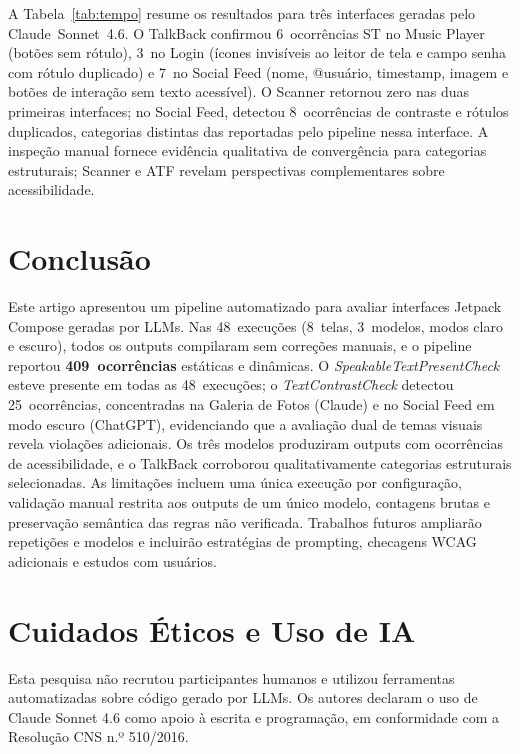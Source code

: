 \documentclass[sigconf,anonymous,review]{webmedia}
\begin{document}
A Tabela~\ref{tab:tempo} resume os resultados para três interfaces
geradas pelo Claude~Sonnet~4.6. O TalkBack confirmou 6~ocorrências
ST no Music Player (botões sem rótulo), 3~no Login (ícones invisíveis
ao leitor de tela e campo senha com rótulo duplicado) e 7~no Social
Feed (nome, @usuário, timestamp, imagem e botões de interação sem
texto acessível). O Scanner retornou zero nas duas primeiras
interfaces; no Social Feed, detectou 8~ocorrências de contraste e
rótulos duplicados, categorias distintas das reportadas pelo
pipeline nessa interface. A inspeção manual fornece evidência
qualitativa de convergência para categorias estruturais; Scanner e
ATF revelam perspectivas complementares sobre acessibilidade.

\section{Conclusão}
\label{sec:conclusao}

Este artigo apresentou um pipeline automatizado para avaliar
interfaces Jetpack Compose geradas por LLMs. Nas 48~execuções
(8~telas, 3~modelos, modos claro e escuro), todos os outputs
compilaram sem correções manuais, e o pipeline reportou
\textbf{409~ocorrências} estáticas e dinâmicas. O
\textit{SpeakableTextPresentCheck} esteve presente em todas as
48~execuções; o \textit{TextContrastCheck} detectou
25~ocorrências, concentradas na Galeria de Fotos (Claude) e no
Social Feed em modo escuro (ChatGPT), evidenciando que a avaliação
dual de temas visuais revela violações adicionais. Os três modelos
produziram outputs com ocorrências de acessibilidade, e o TalkBack
corroborou qualitativamente categorias estruturais selecionadas.
As limitações incluem uma única execução por configuração,
validação manual restrita aos outputs de um único modelo,
contagens brutas e preservação semântica das regras não
verificada. Trabalhos futuros ampliarão repetições e modelos
e incluirão estratégias de prompting, checagens WCAG adicionais
e estudos com usuários.

\section*{Cuidados Éticos e Uso de IA} Esta pesquisa não recrutou participantes humanos e utilizou ferramentas automatizadas sobre código gerado por LLMs. Os autores declaram o uso de Claude Sonnet 4.6 como apoio à escrita e programação, em conformidade com a Resolução CNS n.º 510/2016.



\end{document}
